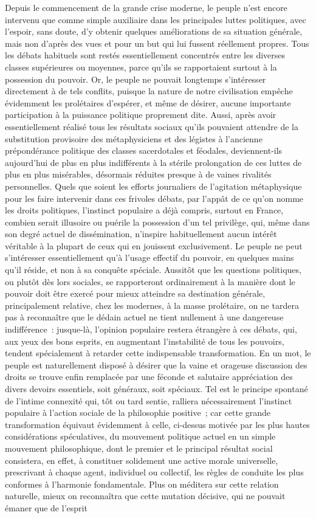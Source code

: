 \documentclass[french,twoside]{book} %
\begin{document}
Depuis le commencement de la grande crise moderne, le peuple n’est encore intervenu que comme simple auxiliaire dans les principales luttes politiques, avec l’espoir, sans doute, d’y obtenir quelques améliorations de sa situation générale, mais non d’après des vues et pour un but qui lui fussent réellement propres. Tous les débats habituels sont restés essentiellement concentrés entre les diverses classes supérieures ou moyennes, parce qu’ils se rapportaient surtout à la possession du pouvoir. Or, le peuple ne pouvait longtemps s’intéresser directement à de tels conflits, puisque la nature de notre civilisation empêche évidemment les prolétaires d’espérer, et même de désirer, aucune importante participation à la puissance politique proprement dite. Aussi, après avoir essentiellement réalisé tous les résultats sociaux qu’ils pouvaient attendre de la substitution provisoire des métaphysiciens et des légistes à l’ancienne prépondérance politique des classes sacerdotales et féodales, deviennent-ils aujourd’hui de plus en plus indifférents à la stérile prolongation de ces luttes de plus en plus misérables, désormais réduites presque à de vaines rivalités personnelles. Quels que soient les efforts journaliers de l’agitation métaphysique pour les faire intervenir dans ces frivoles débats, par l’appât de ce qu’on nomme les droits politiques, l’instinct populaire a déjà compris, surtout en France, combien serait illusoire ou puérile la possession d’un tel privilège, qui, même dans son degré actuel de dissémination, n’inspire habituellement aucun intérêt véritable à la plupart de ceux qui en jouissent exclusivement. Le peuple ne peut s’intéresser essentiellement qu’à l’usage effectif du pouvoir, en quelques mains qu’il réside, et non à sa conquête spéciale. Aussitôt que les questions politiques, ou plutôt dès lors sociales, se rapporteront ordinairement à la manière dont le pouvoir doit être exercé pour mieux atteindre sa destination générale, principalement relative, chez les modernes, à la masse prolétaire, on ne tardera pas à reconnaître que le dédain actuel ne tient nullement à une dangereuse indifférence : jusque-là, l’opinion populaire restera étrangère à ces débats, qui, aux yeux des bons esprits, en augmentant l’instabilité de tous les pouvoirs, tendent spécialement à retarder cette indispensable transformation. En un mot, le peuple est naturellement disposé à désirer que la vaine et orageuse discussion des droits se trouve enfin remplacée par une féconde et salutaire appréciation des divers devoirs essentiels, soit généraux, soit spéciaux. Tel est le principe spontané de l’intime connexité qui, tôt ou tard sentie, ralliera nécessairement l’instinct populaire à l’action sociale de la philosophie positive ; car cette grande transformation équivaut évidemment à celle, ci-dessus motivée par les plus hautes considérations spéculatives, du mouvement politique actuel en un simple mouvement philosophique, dont le premier et le principal résultat social consistera, en effet, à constituer solidement une active morale universelle, prescrivant à chaque agent, individuel ou collectif, les règles de conduite les plus conformes à l’harmonie fondamentale. Plus on méditera sur cette relation naturelle, mieux on reconnaîtra que cette mutation décisive, qui ne pouvait émaner que de l’esprit 
\end{document}
